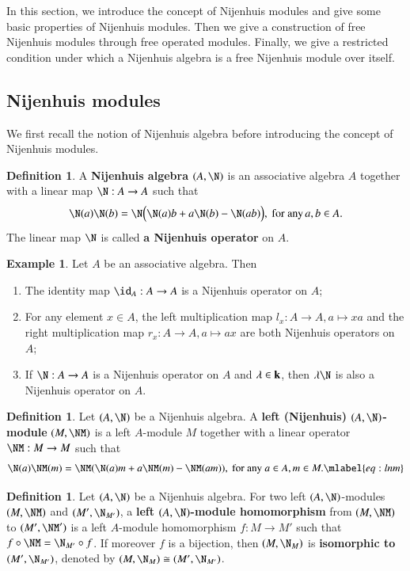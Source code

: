 \documentclass[12pt]{amsart}
\theoremstyle{definition}
\newtheorem{defn}[theorem]{Definition}
\newtheorem{exam}[theorem]{Example}
\begin{document}
In this section, we introduce the concept of Nijenhuis modules and give some basic properties of Nijenhuis modules. Then we give a construction of free Nijenhuis modules through free operated modules. Finally, we give a restricted condition under which a Nijenhuis algebra is a free Nijenhuis module over itself.

\subsection{Nijenhuis modules} We first recall the notion of Nijenhuis algebra before introducing the concept of Nijenhuis modules.

\begin{defn}
A {\bf Nijenhuis algebra} $(A,\N)$ is an associative algebra $A$ together with a linear map $\N: A \to A$ such that 
\begin{align*}
\N(a)\N(b)=\N\Big(\N(a)b+a\N(b)-\N(ab)\Big), \ \text{for any} \, a,b \in A.
\end{align*}
The linear map $\N$ is called {\bf a Nijenhuis operator} on $A$.
\end{defn}

\begin{exam}
Let $A$ be an associative algebra. Then
\begin{enumerate}
\item The identity map $\id_A: A \to A$ is a Nijenhuis operator on $A$; 
\item For any element $x \in A$, the left multiplication map $l_x: A \to A, a \mapsto xa$ and the right multiplication map $r_x:A \to A, a \mapsto ax$ are both Nijenhuis operators on $A$;
\item If $\N: A \to A$ is a Nijenhuis operator on $A$ and $\lambda \in {\bf k}$, then $\lambda \N$ is also a Nijenhuis operator on $A$.
\end{enumerate}
\end{exam}

\begin{defn}
Let $(A,\N)$ be a Nijenhuis algebra. A {\bf left (Nijenhuis) $(A,\N)$-module} $(M,\NM)$ is a
left $A$-module $M$ together with a linear operator $\NM: M \to M$ such that
\begin{align}
\N(a)\NM(m)=\NM(\N(a)m + a\NM(m)-\NM (am)), \ \text{for any } a\in A, m\in M. \mlabel{eq:lnm}
\end{align}
\end{defn}

\begin{defn}
Let $(A,\N)$ be a Nijenhuis algebra.  For two left $(A,\N)$-modules $(M,\NM)$ and $(M',\N_{M'})$, a {\bf left $(A,\N)$-module homomorphism} from $(M, \NM)$ to $(M',\NM')$ is a left $A$-module homomorphism $f: M \to M'$ such that $f \circ \NM=\N_{M'} \circ f$. If moreover $f$ is a bijection, then $(M,\N_M)$ is {\bf isomorphic to} $(M',\N_{M'})$, denoted by $(M,\N_M) \cong (M',\N_{M'})$. 
\end{defn}
\end{document}
